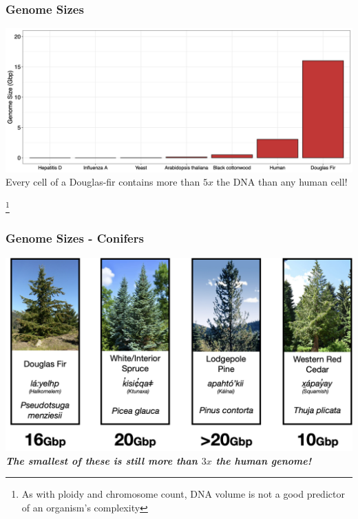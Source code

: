 \documentclass{beamer}
\newcommand\blfootnote[1]{%
	\begingroup
	\renewcommand\thefootnote{}\footnote{#1}%
	\addtocounter{footnote}{-1}%
	\endgroup
}
\begin{document}
\begin{frame}
	\frametitle{Genome Sizes}
	\centering	\includegraphics[keepaspectratio, width  =1\textwidth]{img/dougFir.png}\\
	\vspace{10pt}
	Every cell of a Douglas-fir contains more than $5x$ the DNA than any human cell!

\blfootnote{As with ploidy and chromosome count, DNA volume is not a good predictor of an organism's complexity} 
\end{frame}

\begin{frame}
	\frametitle{Genome Sizes - Conifers}
	\centering	\includegraphics[keepaspectratio, width  =1\textwidth]{img/conifersSize.png}\\
	\textbf{\textit{The smallest of these is still more than $3x$ the human genome!}}
\end{frame}
\end{document}
